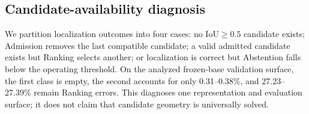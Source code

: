 \subsection{Candidate-availability diagnosis}
We partition localization outcomes into four cases: no IoU$\geq0.5$ candidate
exists; Admission removes the last compatible candidate; a valid admitted
candidate exists but Ranking selects another; or localization is correct but
Abstention falls below the operating threshold.  On the analyzed frozen-base
validation surface, the first class is empty, the second accounts for only
0.31--0.38\%, and 27.23--27.39\% remain Ranking errors.  This diagnoses one
representation and evaluation surface; it does not claim that candidate
geometry is universally solved.

